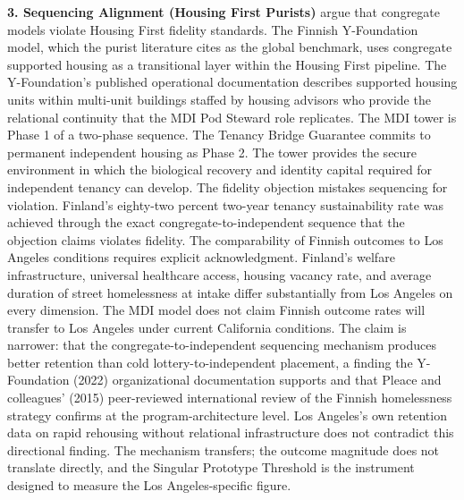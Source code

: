\documentclass[12pt, letterpaper]{article}
\begin{document}
\textbf{3. Sequencing Alignment (Housing First Purists)} argue that congregate models violate Housing First fidelity standards. The Finnish Y-Foundation model, which the purist literature cites as the global benchmark, uses congregate supported housing as a transitional layer within the Housing First pipeline. The Y-Foundation's published operational documentation describes supported housing units within multi-unit buildings staffed by housing advisors who provide the relational continuity that the MDI Pod Steward role replicates. The MDI tower is Phase 1 of a two-phase sequence. The Tenancy Bridge Guarantee commits to permanent independent housing as Phase 2. The tower provides the secure environment in which the biological recovery and identity capital required for independent tenancy can develop. The fidelity objection mistakes sequencing for violation. Finland's eighty-two percent two-year tenancy sustainability rate was achieved through the exact congregate-to-independent sequence that the objection claims violates fidelity. The comparability of Finnish outcomes to Los Angeles conditions requires explicit acknowledgment. Finland's welfare infrastructure, universal healthcare access, housing vacancy rate, and average duration of street homelessness at intake differ substantially from Los Angeles on every dimension. The MDI model does not claim Finnish outcome rates will transfer to Los Angeles under current California conditions. The claim is narrower: that the congregate-to-independent sequencing mechanism produces better retention than cold lottery-to-independent placement, a finding the Y-Foundation (2022) organizational documentation supports and that Pleace and colleagues' (2015) peer-reviewed international review of the Finnish homelessness strategy confirms at the program-architecture level. Los Angeles's own retention data on rapid rehousing without relational infrastructure does not contradict this directional finding. The mechanism transfers; the outcome magnitude does not translate directly, and the Singular Prototype Threshold is the instrument designed to measure the Los Angeles-specific figure.
\end{document}
